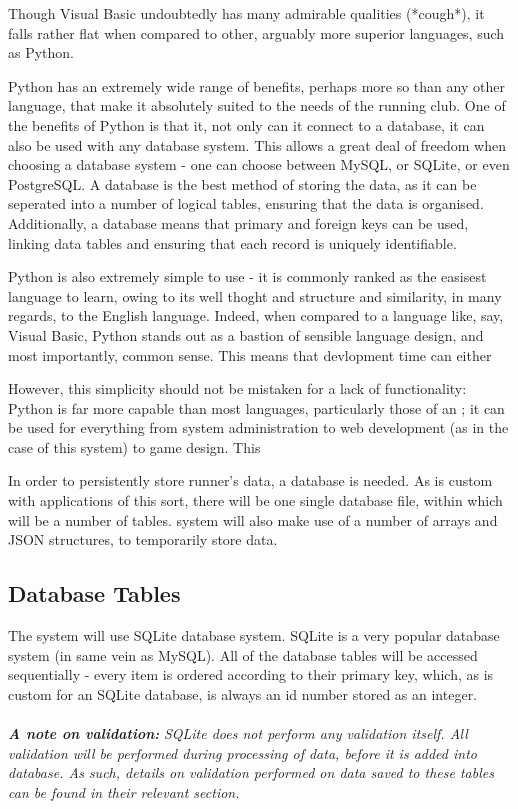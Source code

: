 \documentclass{article}[12pt,a4paper]
\begin{document}
Though Visual Basic undoubtedly has many admirable qualities (*cough*), it falls rather flat when compared to other, arguably more superior languages, such as Python.  

Python has an extremely wide range of benefits, perhaps more so than any other language, that make it absolutely suited to the needs of the running club. One of the benefits of Python is that it, not only can it connect to a database, it can also be used with any database system. This allows a great deal of freedom when choosing a database system - one can choose between MySQL, or SQLite, or even PostgreSQL. A database is the best method of storing the data, as it can be seperated into a number of logical tables, ensuring that the data is organised. Additionally, a database means that primary and foreign keys can be used, linking data tables and ensuring that each record is uniquely identifiable.

Python is also extremely simple to use - it is commonly ranked as the easisest language to learn, owing to its well thoght and structure and similarity, in many regards, to the English language. Indeed, when compared to a language like, say, Visual Basic, Python stands out as a bastion of sensible language design, and most importantly, common sense. This means that devlopment time can either 

However, this simplicity should not be mistaken for a lack of functionality: Python is far more capable than most languages, particularly those of an ; it can be used for everything from system administration to web development (as in the case of this system) to game design. This 

In order to persistently store runner's data, a database is needed. As is custom with applications of this sort, there will be one single database file, within which will be a number of tables. system will also make use of a number of arrays and JSON structures, to temporarily store data.

\subsection{Database Tables}
The system will use SQLite database system. SQLite is a very popular database system (in same vein as MySQL). All of the database tables will be accessed sequentially - every item is ordered according to their primary key, which, as is custom for an SQLite database, is always an id number stored as an integer.
\\\\\textbf{\textit{A note on validation: }}\textit{SQLite does not perform any validation itself. All validation will be performed during processing of data, before it is added into database. As such, details on validation performed on data saved to these tables can be found in their relevant section.}
\end{document}
